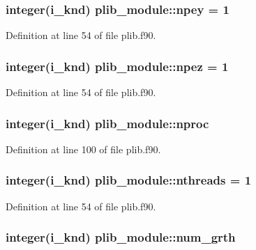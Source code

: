 \hypertarget{classplib__module_a90134f6aac88ad1d7341e79cbf8426f1}{
\subsubsection[{npey}]{\setlength{\rightskip}{0pt plus 5cm}integer(i\-\_\-knd) plib\-\_\-module\-::npey = 1}}\label{classplib__module_a90134f6aac88ad1d7341e79cbf8426f1}


Definition at line 54 of file plib.\-f90.

\hypertarget{classplib__module_ab827d3c46ffc494381bb0962d304561a}{
\subsubsection[{npez}]{\setlength{\rightskip}{0pt plus 5cm}integer(i\-\_\-knd) plib\-\_\-module\-::npez = 1}}\label{classplib__module_ab827d3c46ffc494381bb0962d304561a}


Definition at line 54 of file plib.\-f90.

\hypertarget{classplib__module_ae01601bf17ba60fbd8ec154182186409}{
\subsubsection[{nproc}]{\setlength{\rightskip}{0pt plus 5cm}integer(i\-\_\-knd) plib\-\_\-module\-::nproc}}\label{classplib__module_ae01601bf17ba60fbd8ec154182186409}


Definition at line 100 of file plib.\-f90.

\hypertarget{classplib__module_aac4e1911c67e39262528b4ebf471997d}{
\subsubsection[{nthreads}]{\setlength{\rightskip}{0pt plus 5cm}integer(i\-\_\-knd) plib\-\_\-module\-::nthreads = 1}}\label{classplib__module_aac4e1911c67e39262528b4ebf471997d}


Definition at line 54 of file plib.\-f90.

\hypertarget{classplib__module_a8238cefc81a445bee3e137bb94f75e91}{
\subsubsection[{num\-\_\-grth}]{\setlength{\rightskip}{0pt plus 5cm}integer(i\-\_\-knd) plib\-\_\-module\-::num\-\_\-grth}}\label{classplib__module_a8238cefc81a445bee3e137bb94f75e91}


